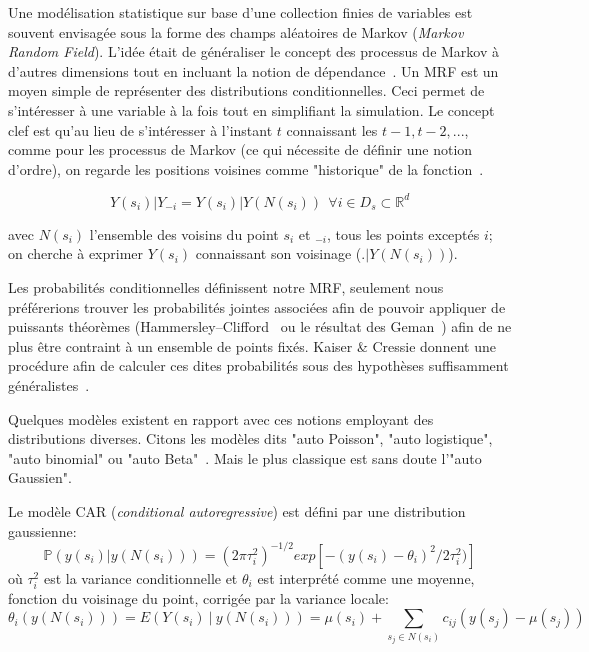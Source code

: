 Une modélisation statistique sur base d'une collection finies de variables est souvent envisagée sous la forme des champs aléatoires de Markov (\textit{Markov Random Field}). L'idée était de généraliser le concept des processus de Markov à d'autres dimensions tout en incluant la notion de dépendance~\cite{besag1974spatial}. Un MRF est un moyen simple de représenter des distributions conditionnelles. Ceci permet de s'intéresser à une variable à la fois tout en simplifiant la simulation. Le concept clef est qu'au lieu de s'intéresser à l'instant $t$ connaissant les $t - 1, t - 2, ...$, comme pour les processus de Markov (ce qui nécessite de définir une notion d'ordre), on regarde les positions voisines comme "historique" de la fonction~\cite{zhang2001segmentation}.

\begin{equation}
    Y(s_{i})|Y_{-i} = Y(s_{i})|Y(N(s_{i})) ~~ \forall i \in D_{s} \subset \mathbb{R}^{d}
\end{equation}

avec $N(s_{i})$ l'ensemble des voisins du point $s_{i}$ et $_{-i}$, tous les points exceptés $i$; on cherche à exprimer $Y(s_{i})$ connaissant son voisinage ($.|Y(N(s_{i}))$).

Les probabilités conditionnelles définissent notre MRF, seulement nous préférerions trouver les probabilités jointes associées afin de pouvoir appliquer de puissants théorèmes (Hammersley–Clifford~\cite{grimmett1973theorem} ou le résultat des Geman~\cite{geman1984stochastic}) afin de ne plus être contraint à un ensemble de points fixés. Kaiser \& Cressie donnent une procédure afin de calculer ces dites probabilités sous des hypothèses suffisamment généralistes~\cite{kaiser2000construction}.

Quelques modèles existent en rapport avec ces notions employant des distributions diverses. Citons les modèles dits "auto Poisson", "auto logistique", "auto binomial" ou "auto Beta"~\cite{west1985dynamic, lichstein2002spatial}. Mais le plus classique est sans doute l'"auto Gaussien".

Le modèle CAR (\textit{conditional autoregressive}) est défini par une distribution gaussienne:
\begin{equation}
    \mathbb{P}(y(s_{i}) | y(N(s_{i}))) = (2\pi\tau_{i}^{2})^{-1/2} exp[-(y(s_{i}) - \theta_{i})^{2} / 2\tau_{i}^{2})]
\end{equation}
où $\tau_{i}^{2}$ est la variance conditionnelle et $\theta_{i}$ est interprété comme une moyenne, fonction du voisinage du point, corrigée par la variance locale:
\begin{equation}
    \theta_{i}(y(N(s_{i}))) = E(Y(s_{i}) ~ | ~ y(N(s_{i}))) = \mu(s_{i}) + \sum\limits_{s_{j} \in N(s_{i})} c_{ij} (y(s_{j}) - \mu(s_{j}))
\end{equation}


